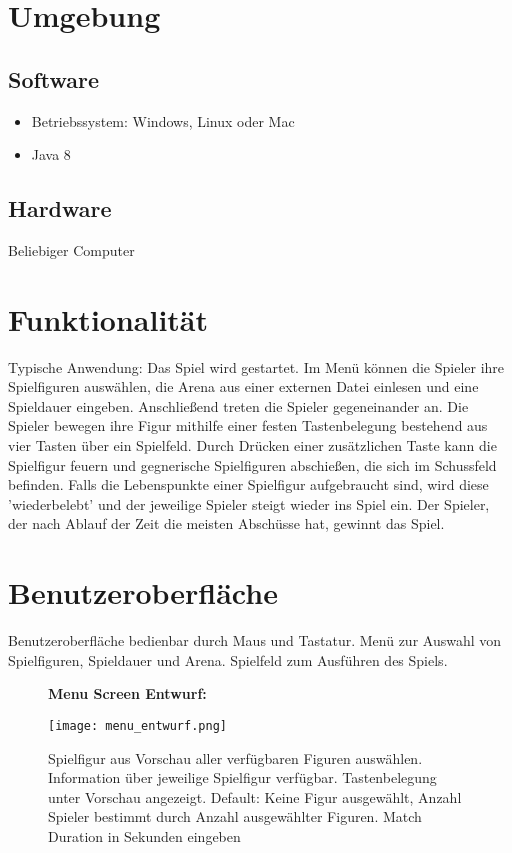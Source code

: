 \section{Umgebung}
\subsection{Software}
\begin{itemize}
\item Betriebssystem: Windows, Linux oder Mac
\item Java 8
\end{itemize}
\subsection{Hardware}
Beliebiger Computer

\section{Funktionalität}
Typische Anwendung: Das Spiel wird gestartet. Im Menü können die Spieler ihre Spielfiguren auswählen, die Arena aus einer externen Datei einlesen und eine Spieldauer eingeben. Anschließend treten die Spieler gegeneinander an. Die Spieler bewegen ihre Figur mithilfe einer festen Tastenbelegung bestehend aus vier Tasten über ein Spielfeld. Durch Drücken einer zusätzlichen Taste kann die Spielfigur feuern und gegnerische Spielfiguren abschießen, die sich im Schussfeld befinden. Falls die Lebenspunkte einer Spielfigur aufgebraucht sind, wird diese 'wiederbelebt' und der jeweilige Spieler steigt wieder ins Spiel ein. Der Spieler, der nach Ablauf der Zeit die meisten Abschüsse hat, gewinnt das Spiel.

\section{Benutzeroberfläche}
Benutzeroberfläche bedienbar durch Maus und Tastatur.
Menü zur Auswahl von Spielfiguren, Spieldauer und Arena. Spielfeld zum Ausführen des Spiels.
\begin{figure}[H]
\textbf{Menu Screen Entwurf:}\par\medskip
\centering
\texttt{[image: menu\_entwurf.png]}
 \caption{Spielfigur aus Vorschau aller verfügbaren Figuren auswählen. Information über jeweilige Spielfigur verfügbar. Tastenbelegung unter Vorschau angezeigt. Default: Keine Figur ausgewählt, Anzahl Spieler bestimmt durch Anzahl ausgewählter Figuren. Match Duration in Sekunden eingeben}
\end{figure}

